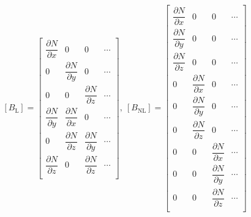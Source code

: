 \documentclass{article}
\begin{document}
\begin{align}
    \left[B_{\text{L}}\right]
    =\left[
        \begin{array}{ccc|c}
            \dfrac{\partial{N}}{\partial{x}} & 0                                & 0                                & \cdots \\
            0                                & \dfrac{\partial{N}}{\partial{y}} & 0                                & \cdots \\
            0                                & 0                                & \dfrac{\partial{N}}{\partial{z}} & \cdots \\
            \dfrac{\partial{N}}{\partial{y}} & \dfrac{\partial{N}}{\partial{x}} & 0                                & \cdots \\
            0                                & \dfrac{\partial{N}}{\partial{z}} & \dfrac{\partial{N}}{\partial{y}} & \cdots \\
            \dfrac{\partial{N}}{\partial{z}} & 0                                & \dfrac{\partial{N}}{\partial{z}} & \cdots \\
        \end{array}
        \right]
    ,\ \left[B_{\text{NL}}\right]
    =\left[
        \begin{array}{ccc|c}
            \dfrac{\partial{N}}{\partial{x}} & 0                                & 0                                & \cdots \\
            \dfrac{\partial{N}}{\partial{y}} & 0                                & 0                                & \cdots \\
            \dfrac{\partial{N}}{\partial{z}} & 0                                & 0                                & \cdots \\
            0                                & \dfrac{\partial{N}}{\partial{x}} & 0                                & \cdots \\
            0                                & \dfrac{\partial{N}}{\partial{y}} & 0                                & \cdots \\
            0                                & \dfrac{\partial{N}}{\partial{z}} & 0                                & \cdots \\
            0                                & 0                                & \dfrac{\partial{N}}{\partial{x}} & \cdots \\
            0                                & 0                                & \dfrac{\partial{N}}{\partial{y}} & \cdots \\
            0                                & 0                                & \dfrac{\partial{N}}{\partial{z}} & \cdots \\
        \end{array}
        \right]
    \nonumber
\end{align}
\end{document}
